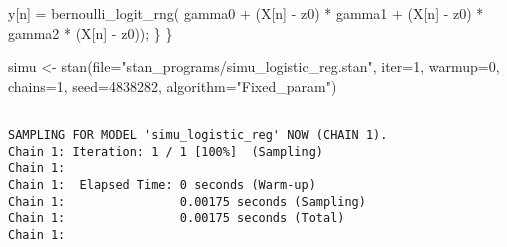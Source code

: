 \documentclass[
  letterpaper,
  DIV=11,
  numbers=noendperiod]{scrartcl}
\newenvironment{Shaded}{\begin{snugshade}}{\end{snugshade}}
\newcommand{\AttributeTok}[1]{\textcolor[rgb]{0.40,0.45,0.13}{#1}}
\newcommand{\DecValTok}[1]{\textcolor[rgb]{0.68,0.00,0.00}{#1}}
\newcommand{\FunctionTok}[1]{\textcolor[rgb]{0.28,0.35,0.67}{#1}}
\newcommand{\NormalTok}[1]{\textcolor[rgb]{0.00,0.23,0.31}{#1}}
\newcommand{\OtherTok}[1]{\textcolor[rgb]{0.00,0.23,0.31}{#1}}
\newcommand{\SpecialCharTok}[1]{\textcolor[rgb]{0.37,0.37,0.37}{#1}}
\newcommand{\StringTok}[1]{\textcolor[rgb]{0.13,0.47,0.30}{#1}}
\begin{document}
\begin{Shaded}
\begin{Highlighting}[]
\NormalTok{    y[n] = bernoulli\_logit\_rng(  gamma0 }
\NormalTok{                               + (X[n] {-} z0\textquotesingle{}) * gamma1}
\NormalTok{                               + (X[n] {-} z0\textquotesingle{}) * gamma2 * (X[n] {-} z0\textquotesingle{})\textquotesingle{});}
\NormalTok{  \}}
\NormalTok{\}}
\end{Highlighting}
\end{Shaded}

\begin{Shaded}
\begin{Highlighting}[]
\NormalTok{simu }\OtherTok{\textless{}{-}} \FunctionTok{stan}\NormalTok{(}\AttributeTok{file=}\StringTok{"stan\_programs/simu\_logistic\_reg.stan"}\NormalTok{,}
             \AttributeTok{iter=}\DecValTok{1}\NormalTok{, }\AttributeTok{warmup=}\DecValTok{0}\NormalTok{, }\AttributeTok{chains=}\DecValTok{1}\NormalTok{,}
             \AttributeTok{seed=}\DecValTok{4838282}\NormalTok{, }\AttributeTok{algorithm=}\StringTok{"Fixed\_param"}\NormalTok{)}
\end{Highlighting}
\end{Shaded}

\begin{verbatim}

SAMPLING FOR MODEL 'simu_logistic_reg' NOW (CHAIN 1).
Chain 1: Iteration: 1 / 1 [100%]  (Sampling)
Chain 1: 
Chain 1:  Elapsed Time: 0 seconds (Warm-up)
Chain 1:                0.00175 seconds (Sampling)
Chain 1:                0.00175 seconds (Total)
Chain 1: 
\end{verbatim}

\begin{Shaded}
\end{Shaded}
\end{document}
